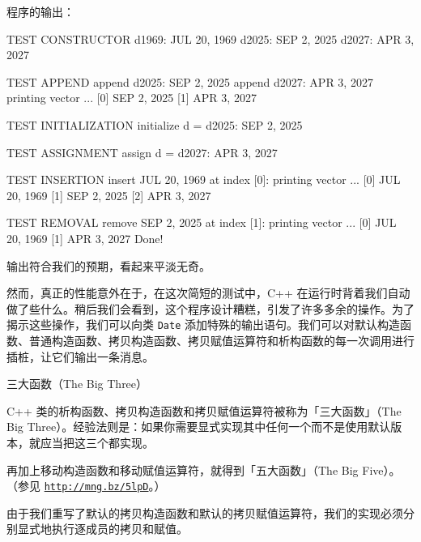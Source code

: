 程序的输出：

\begin{codebox}
TEST CONSTRUCTOR
d1969: JUL 20, 1969
d2025: SEP 2, 2025
d2027: APR 3, 2027

TEST APPEND
append d2025: SEP 2, 2025
append d2027: APR 3, 2027
printing vector ...
[0] SEP 2, 2025
[1] APR 3, 2027

TEST INITIALIZATION
initialize d = d2025:
SEP 2, 2025

TEST ASSIGNMENT
assign d = d2027:
APR 3, 2027

TEST INSERTION
insert JUL 20, 1969 at index [0]:
printing vector ...
[0] JUL 20, 1969
[1] SEP 2, 2025
[2] APR 3, 2027

TEST REMOVAL
remove SEP 2, 2025 at index [1]:
printing vector ...
[0] JUL 20, 1969
[1] APR 3, 2027
Done!
\end{codebox}

输出符合我们的预期，看起来平淡无奇。

然而，真正的性能意外在于，在这次简短的测试中，C++ 在运行时背着我们自动做了些什么。稍后我们会看到，这个程序设计糟糕，引发了许多多余的操作。为了揭示这些操作，我们可以向类 \texttt{Date} 添加特殊的输出语句。我们可以对默认构造函数、普通构造函数、拷贝构造函数、拷贝赋值运算符和析构函数的每一次调用进行插桩，让它们输出一条消息。

\begin{mySidebar}{三大函数（The Big Three）}

C++ 类的析构函数、拷贝构造函数和拷贝赋值运算符被称为「三大函数」（The Big Three）。经验法则是：如果你需要显式实现其中任何一个而不是使用默认版本，就应当把这三个都实现。

再加上移动构造函数和移动赋值运算符，就得到「五大函数」（The Big Five）。（参见 \href{http://mng.bz/5lpD}{\nolinkurl{http://mng.bz/5lpD}}。）
\end{mySidebar}

由于我们重写了默认的拷贝构造函数和默认的拷贝赋值运算符，我们的实现必须分别显式地执行逐成员的拷贝和赋值。

